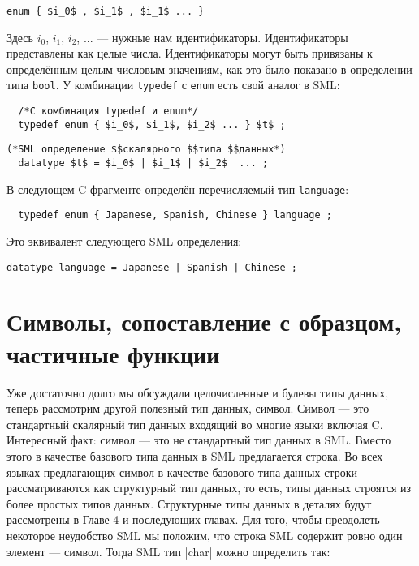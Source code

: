 \begin{lstlisting}
enum { $i_0$ , $i_1$ , $i_1$ ... }
\end{lstlisting}

Здесь $i_0$, $i_1$, $i_2$, ... --- нужные нам идентификаторы. Идентификаторы представлены как целые числа. Идентификаторы могут быть привязаны к определённым целым числовым значениям, как это было показано в определении типа \lstinline|bool|. У комбинации \lstinline|typedef| с \lstinline|enum| есть свой аналог в SML:

\begin{lstlisting}
  /*C комбинация typedef и enum*/
  typedef enum { $i_0$, $i_1$, $i_2$ ... } $t$ ;
\end{lstlisting}

\begin{lstlisting}[style=customml]
  (*SML определение $$скалярного $$типа $$данных*)
  datatype $t$ = $i_0$ | $i_1$ | $i_2$  ... ;
\end{lstlisting}

В следующем C фрагменте определён перечисляемый тип \lstinline|language|:

\begin{lstlisting}
  typedef enum { Japanese, Spanish, Chinese } language ;
\end{lstlisting}

Это эквивалент следующего SML определения:

\begin{lstlisting}[style=customml]
  datatype language = Japanese | Spanish | Chinese ;
\end{lstlisting}

\section{Символы, сопоставление с образцом, частичные функции}\label{CharactersPatternMatchin}

Уже достаточно долго мы обсуждали целочисленные и булевы типы данных, теперь рассмотрим другой полезный тип данных, символ. Символ --- это стандартный скалярный тип данных входящий во многие языки включая C. Интересный факт: символ --- это не стандартный тип данных в SML. Вместо этого в качестве базового типа данных в SML предлагается строка. Во всех языках предлагающих символ в качестве базового типа данных строки рассматриваются как структурный тип данных, то есть, типы данных строятся из более простых типов данных. Структурные типы данных в деталях будут рассмотрены в Главе 4 и последующих главах. Для того, чтобы преодолеть некоторое неудобство SML мы положим, что строка SML содержит ровно один элемент --- символ. Тогда SML тип \inline|char| можно определить так:

